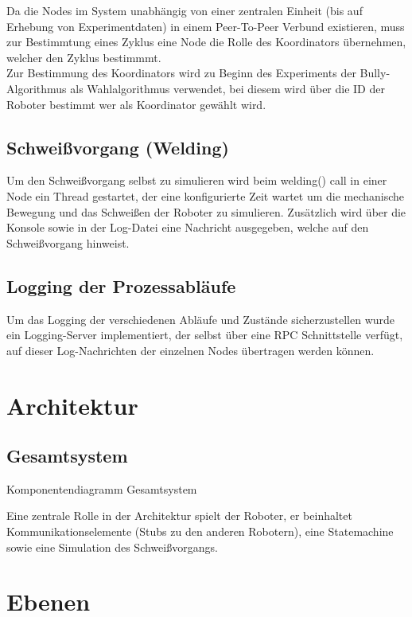 Da die Nodes im System unabhängig von einer zentralen Einheit (bis auf Erhebung von Experimentdaten)
in einem Peer-To-Peer \citep{tanenbaumvansteen} Verbund existieren, muss zur Bestimmtung 
eines Zyklus eine Node die Rolle des Koordinators \citep{tanenbaumvansteen} übernehmen, welcher den Zyklus bestimmmt.\\
Zur Bestimmung des Koordinators wird zu Beginn des Experiments der Bully-Algorithmus \citep{tanenbaumvansteen}
als Wahlalgorithmus verwendet, bei diesem wird über die ID der Roboter bestimmt wer als
Koordinator gewählt wird.

\subsection{Schweißvorgang (Welding)}

Um den Schweißvorgang selbst zu simulieren wird beim welding() call in einer Node ein Thread gestartet,
der eine konfigurierte Zeit wartet um die mechanische Bewegung und das Schweißen der Roboter zu simulieren. Zusätzlich wird über die Konsole sowie in der Log-Datei eine Nachricht ausgegeben,
welche auf den Schweißvorgang hinweist.

\subsection{Logging der Prozessabläufe}

Um das Logging der verschiedenen Abläufe und Zustände sicherzustellen wurde ein Logging-Server implementiert,
der selbst über eine RPC Schnittstelle verfügt, auf dieser Log-Nachrichten der einzelnen Nodes übertragen
werden können.

\section{Architektur}

\subsection{Gesamtsystem}

 {Komponentendiagramm Gesamtsystem}

Eine zentrale Rolle in der Architektur spielt der Roboter, er beinhaltet Kommunikationselemente (Stubs 
\citep{tanenbaumvansteen} zu den anderen Robotern), eine Statemachine sowie eine Simulation des
Schweißvorgangs.

\section{Ebenen}
